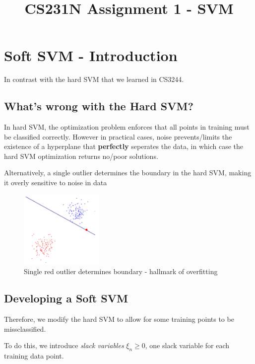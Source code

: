 \documentclass{article}
\title{\vspace{-2cm} CS231N Assignment 1 - SVM}
\date{\vspace{-5ex}}
\begin{document}
\maketitle

\section{Soft SVM - Introduction}
In contrast with the hard SVM that we learned in CS3244.

\subsection{What's wrong with the Hard SVM?}
In hard SVM, the optimization problem enforces that all points in training must be classified correctly.
However in practical cases, noise prevents/limits the existence of a hyperplane that \textbf{perfectly} seperates the data, in which case the hard SVM optimization returns no/poor solutions.

Alternatively, a single outlier determines the boundary in the hard SVM, making it overly sensitive to noise in data
\begin{figure}[htp]
    \centering
    \includegraphics[width=4cm, scale=1]{images/hardSVM.PNG}
    \caption{Single red outlier determines boundary - hallmark of overfitting}
\end{figure}

\subsection{Developing a Soft SVM}
Therefore, we modify the hard SVM to allow for some training points to be missclassified.

To do this, we introduce \textit{slack variables} $\xi_{n} \ge 0$, one slack variable for each training data point.
\end{document}

